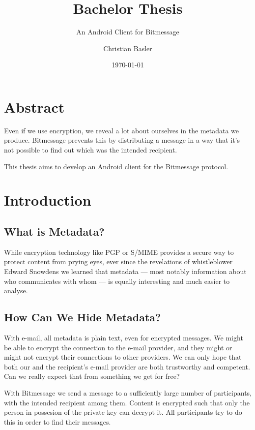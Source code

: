 \documentclass{bfh}
\title{Bachelor Thesis}
\subtitle{An Android Client for Bitmessage}
\author{Christian Basler}
\date{\today}
\begin{document}
  \maketitle

  \tableofcontents

  \listoffigures

  \newpage
  \section*{Abstract}

  Even if we use encryption, we reveal a lot about ourselves in the metadata we produce. Bitmessage prevents this by distributing a message in a way that it's not possible to find out which was the intended recipient.
  
  This thesis aims to develop an Android client for the Bitmessage protocol.

  \newpage

  \section{Introduction}

  \subsection{What is Metadata?}

  While encryption technology like PGP or S/MIME provides a secure way to protect content from prying eyes, ever since the revelations of whistleblower Edward Snowdens we learned that metadata --- most notably information about who communicates with whom --- is equally interesting and much easier to analyse.\cite{guardian:metadata}

  \subsection{How Can We Hide Metadata?}

  With e-mail, all metadata is plain text, even for encrypted messages. We might be able to encrypt the connection to the e-mail provider, and they might or might not encrypt their connections to other providers. We can only hope that both our and the recipient's e-mail provider are both trustworthy and competent. Can we really expect that from something we get for free?

  With Bitmessage we send a message to a sufficiently large number of participants, with the intended recipient among them. Content is encrypted such that only the person in possesion of the private key can decrypt it. All participants try to do this in order to find their messages.
\end{document}
